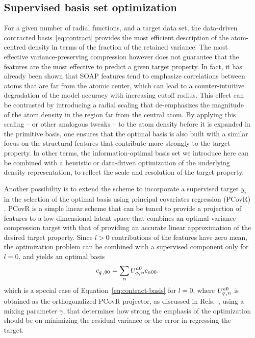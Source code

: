 \subsection{Supervised basis set optimization}
For a given number of radial functions, and a target data set, the data-driven contracted basis~\eqref{eq:contract} provides the most efficient description of the atom-centred density in terms of the fraction of the retained variance.
The most effective variance-preserving compression however does not guarantee that the features are the most effective to predict a given target property.
In fact, it has already been shown that SOAP features tend to emphasize correlations between atoms that are far from the atomic center, which can lead to a counter-intuitive degradation of the model accuracy with increasing cutoff radius\cite{bart+17sa,will+18pccp}. 
This effect can be contrasted by introducing a radial scaling\cite{huang2016communication,will+18pccp} that de-emphasizes the magnitude of the atom density in the region far from the central atom. 
By applying this scaling -- or other analogous tweaks\cite{caro2019optimizing} -- to the atom density before it is expanded in the primitive basis, one ensures that the optimal basis is also built with a similar focus on the structural features that contribute more strongly to the target property.
In other terms, the information-optimal basis set we introduce here can be combined with a heuristic or data-driven optimization of the underlying density representation, to reflect the scale and resolution of the target property.


Another possibility is to extend the scheme to incorporate a supervised target $y_i$ in the selection of the optimal basis using principal covariates regression (PCovR) \cite{dejo-kier92cils,helf+20mlst}.
PCovR is a simple linear scheme that can be tuned to provide a projection of features to a low-dimensional latent space that combines an optimal variance compression target with that of providing an accurate linear approximation of the desired target property. 
Since $l>0$ contributions of the features have zero mean, the optimization problem can be combined with a supervised component only for $l=0$, and yields an optimal basis
\begin{equation}
  c_{q_\gamma00} = \sum_n U^{a0}_{q_\gamma n} c_{n00}.
\end{equation}
which is a special case of Equation~\eqref{eq:contract-basis} for $l=0$, 
where $U^{a0}_{q_\gamma n}$ is obtained as the orthogonalized PCovR projector, as discussed in Refs.~, using a mixing parameter $\gamma$, that determines how strong the emphasis of the optimization should be on minimizing the residual variance or the error in regressing the target.


